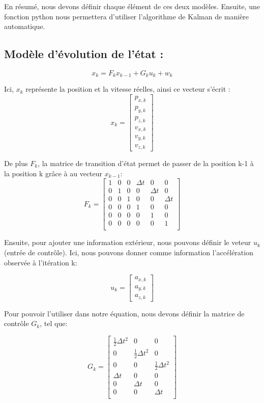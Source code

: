 En résumé, nous devons définir chaque élément de ces deux modèles. Ensuite, une fonction python nous permettera d'utiliser l'algorithme de Kalman de manière automatique.

\subsection*{Modèle d’évolution de l’état :}
\[
x_k = F_k x_{k-1} + G_k u_k + w_k
\]

Ici, \( x_k \) représente la position et la vitesse réelles, ainsi ce vecteur s'écrit :
\[
x_k = \begin{bmatrix}
p_{x,k} \\
p_{y,k} \\
p_{z,k} \\
v_{x,k} \\
v_{y,k} \\
v_{z,k}
\end{bmatrix}
\]

De plus \( F_k \), la matrice de transition d'état permet de passer de la position k-1 à la position k grâce à au vecteur \( x_{k-1} \):
\[
F_k = 
\begin{bmatrix}
1 & 0 & 0 & \Delta t & 0 & 0 \\
0 & 1 & 0 & 0 & \Delta t & 0 \\
0 & 0 & 1 & 0 & 0 & \Delta t \\
0 & 0 & 0 & 1 & 0 & 0 \\
0 & 0 & 0 & 0 & 1 & 0 \\
0 & 0 & 0 & 0 & 0 & 1 \\
\end{bmatrix}
\]

Ensuite, pour ajouter une information extérieur, nous pouvons définir le veteur \( u_k \) (entrée de contrôle). Ici, nous pouvons donner comme information l'accélération observée à l'itération k:

\[
u_k = \begin{bmatrix}
a_{x,k} \\
a_{y,k} \\
a_{z,k}
\end{bmatrix}
\]

Pour pouvoir l'utiliser dans notre équation, nous devons définir la matrice de contrôle \( G_k \), tel que:

\[
G_k = \begin{bmatrix}
\frac{1}{2} \Delta t^2 & 0 & 0 \\
0 & \frac{1}{2} \Delta t^2 & 0 \\
0 & 0 & \frac{1}{2} \Delta t^2 \\
\Delta t & 0 & 0 \\
0 & \Delta t & 0 \\
0 & 0 & \Delta t \\
\end{bmatrix}
\]

